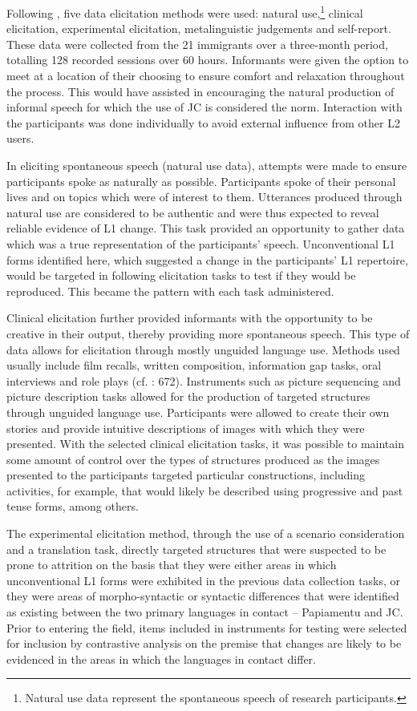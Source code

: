 \documentclass[output=paper,colorlinks,citecolor=brown]{langscibook}
\begin{document}
Following \citet{Ellis1994}, five data elicitation methods were used: natural use,\footnote{Natural use data represent the spontaneous speech of research participants.} clinical elicitation, experimental elicitation, metalinguistic judgements and self-report. These data were collected from the 21 immigrants over a three-month period, totalling 128 recorded sessions over 60 hours. Informants were given the option to meet at a location of their choosing to ensure comfort and relaxation throughout the process. This would have assisted in encouraging the natural production of informal speech for which the use of JC is considered the norm. Interaction with the participants was done individually to avoid external influence from other L2 users.

In eliciting spontaneous speech (natural use data), attempts were made to ensure participants spoke as naturally as possible. Participants spoke of their personal lives and on topics which were of interest to them. Utterances produced through natural use are considered to be authentic \citep[671]{Ellis1994} and were thus expected to reveal reliable evidence of L1 change.  This task provided an opportunity to gather data which was a true representation of the participants’ speech. Unconventional L1 forms identified here, which suggested a change in the participants’ L1 repertoire, would be targeted in following elicitation tasks to test if they would be reproduced. This became the pattern with each task administered.

Clinical elicitation further provided informants with the opportunity to be creative in their output, thereby providing more spontaneous speech. This type of data allows for elicitation through mostly unguided language use. Methods used usually include film recalls, written composition, information gap tasks, oral interviews and role plays (cf. \citealt{Ellis1994}: 672). Instruments such as picture sequencing and picture description tasks allowed for the production of targeted structures through unguided language use. Participants were allowed to create their own stories and provide intuitive descriptions of images with which they were presented. With the selected clinical elicitation tasks, it was possible to maintain some amount of control over the types of structures produced as the images presented to the participants targeted particular constructions, including activities, for example, that would likely be described using progressive and past tense forms, among others.

The experimental elicitation method, through the use of a scenario consideration and a translation task, directly targeted structures that were suspected to be prone to attrition on the basis that they were either areas in which unconventional L1 forms were exhibited in the previous data collection tasks, or they were areas of morpho-syntactic or syntactic differences that were identified as existing between the two primary languages in contact -- Papiamentu and JC. Prior to entering the field, items included in instruments for testing were selected for inclusion by contrastive analysis on the premise that changes are likely to be evidenced in the areas in which the languages in contact differ.
\end{document}
